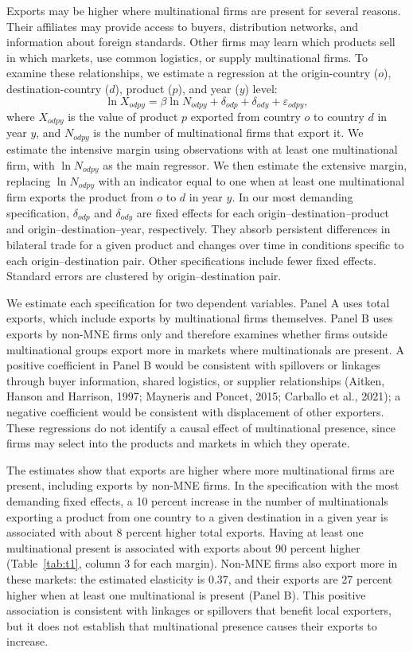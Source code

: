 \documentclass[11pt,a4paper]{article}
\begin{document}
Exports may be higher where multinational firms are present for several reasons. Their affiliates
may provide access to buyers, distribution networks, and information about foreign standards. Other
firms may learn which products sell in which markets, use common logistics, or supply multinational
firms. To examine these relationships, we estimate a regression at the origin-country ($o$),
destination-country ($d$), product ($p$), and year ($y$) level:
\begin{equation}\label{eq:presence}
\ln X_{odpy} = \beta \ln N_{odpy} + \delta_{odp} + \delta_{ody} + \varepsilon_{odpy},
\end{equation}
where $X_{odpy}$ is the value of product $p$ exported from country $o$ to country $d$ in year
$y$, and $N_{odpy}$ is the number of multinational firms that export it. We estimate the intensive
margin using observations with at least one multinational firm, with $\ln N_{odpy}$ as the main
regressor. We then estimate the extensive margin, replacing $\ln N_{odpy}$ with an indicator equal
to one when at least one multinational firm exports the product from $o$ to $d$ in year $y$. In
our most demanding specification, $\delta_{odp}$ and $\delta_{ody}$ are fixed effects for each
origin--destination--product and origin--destination--year, respectively. They absorb persistent
differences in bilateral trade for a given product and changes over time in conditions specific
to each origin--destination pair. Other specifications include fewer fixed effects. Standard
errors are clustered by origin--destination pair.

We estimate each specification for two dependent variables. Panel A uses total exports, which
include exports by multinational firms themselves. Panel B uses exports by non-MNE firms only and
therefore examines whether firms outside multinational groups export more in markets where
multinationals are present. A positive coefficient in Panel B would be consistent with spillovers
or linkages through buyer information, shared logistics, or supplier relationships (Aitken, Hanson
and Harrison, 1997; Mayneris and Poncet, 2015; Carballo et al., 2021); a negative coefficient would
be consistent with displacement of other exporters. These regressions do not identify a causal
effect of multinational presence, since firms may select into the products and markets in which
they operate.

The estimates show that exports are higher where more multinational firms are present, including
exports by non-MNE firms. In the specification with the most demanding fixed effects, a 10 percent
increase in the number of multinationals exporting a product from one country to a given
destination in a given year is associated with about 8 percent higher total exports. Having at
least one multinational present is associated with exports about 90 percent higher (Table~\ref{tab:t1},
column 3 for each margin). Non-MNE firms also export more in these markets: the estimated elasticity
is 0.37, and their exports are 27 percent higher when at least one multinational is present (Panel
B). This positive association is consistent with linkages or spillovers that benefit local
exporters, but it does not establish that multinational presence causes their exports to increase.
\end{document}
